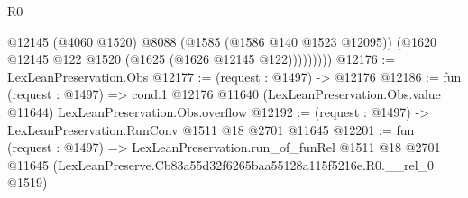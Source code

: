 \begin{lexlean}{R0}
\begin{coremodule}
                @12145
                (@4060 @1520)
                @8088
                (@1585 (@1586 @140 @1523 @12095))
                (@1620 @12145 @122 @1520 (@1625 (@1626 @12145 @122)))))))))
@12176 := LexLeanPreservation.Obs
@12177 := (request : @1497) -> @12176
@12186 := fun (request : @1497) =>
  cond.{1} @12176 @11640 (LexLeanPreservation.Obs.value @11644) LexLeanPreservation.Obs.overflow
@12192 := (request : @1497) -> LexLeanPreservation.RunConv @1511 @18 @2701 @11645
@12201 := fun (request : @1497) =>
  LexLeanPreservation.run_of_funRel
    @1511
    @18
    @2701
    @11645
    (LexLeanPreserve.Cb83a55d32f6265baa55128a115f5216e.R0.__rel_0 @1519)
\end{coremodule}
\end{lexlean}
